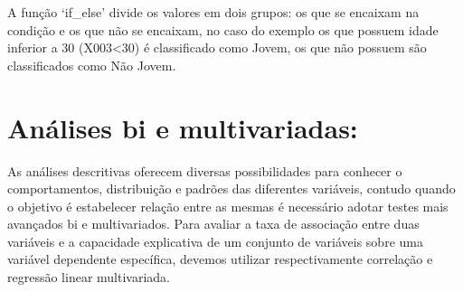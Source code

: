 \documentclass[
  brazil,
]{book}
\newenvironment{Shaded}{\begin{snugshade}}{\end{snugshade}}
\newcommand{\CommentTok}[1]{\textcolor[rgb]{0.56,0.35,0.01}{\textit{#1}}}
\newcommand{\DataTypeTok}[1]{\textcolor[rgb]{0.13,0.29,0.53}{#1}}
\newcommand{\KeywordTok}[1]{\textcolor[rgb]{0.13,0.29,0.53}{\textbf{#1}}}
\newcommand{\NormalTok}[1]{#1}
\newcommand{\OperatorTok}[1]{\textcolor[rgb]{0.81,0.36,0.00}{\textbf{#1}}}
\newcommand{\OtherTok}[1]{\textcolor[rgb]{0.56,0.35,0.01}{#1}}
\newcommand{\StringTok}[1]{\textcolor[rgb]{0.31,0.60,0.02}{#1}}
\begin{document}
A função `if\_else' divide os valores em dois grupos: os que se encaixam na condição e os que não se encaixam, no caso do exemplo os que possuem idade inferior a 30 (X003\textless30) é classificado como Jovem, os que não possuem são classificados como Não Jovem.

\begin{Shaded}
\end{Shaded}

\hypertarget{anuxe1lises-bi-e-multivariadas}{%
\section{Análises bi e multivariadas:}\label{anuxe1lises-bi-e-multivariadas}}

As análises descritivas oferecem diversas possibilidades para conhecer o comportamentos, distribuição e padrões das diferentes variáveis, contudo quando o objetivo é estabelecer relação entre as mesmas é necessário adotar testes mais avançados bi e multivariados. Para avaliar a taxa de associação entre duas variáveis e a capacidade explicativa de um conjunto de variáveis sobre uma variável dependente específica, devemos utilizar respectivamente correlação e regressão linear multivariada.
\end{document}
